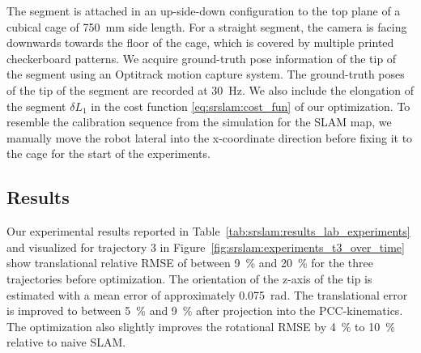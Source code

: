 %
The segment is attached in an up-side-down configuration to the top plane of a cubical cage of \SI{750}{mm} side length. For a straight segment, the camera is facing downwards towards the floor of the cage, which is covered by multiple printed checkerboard patterns.
%
We acquire ground-truth pose information of the tip of the segment using an Optitrack motion capture system. %
The ground-truth poses of the tip of the segment are recorded at \SI{30}{Hz}. %
%
%
We also include the elongation of the segment $\delta L_1$ in the cost function \eqref{eq:srslam:cost_fun} of our optimization.
%
To resemble the calibration sequence from the simulation for the \gls{SLAM} map, we manually move the robot lateral into the x-coordinate direction before fixing it to the cage for the start of the experiments.

\subsection{Results}
Our experimental results reported in Table~\ref{tab:srslam:results_lab_experiments} and visualized for trajectory 3 in Figure~\ref{fig:srslam:experiments_t3_over_time} show translational relative \gls{RMSE} of between \SI{9}{\percent} and \SI{20}{\percent} for the three trajectories before optimization. 
The orientation of the z-axis of the tip is estimated with a mean error of approximately \SI{0.075}{\radian}.
The translational error is improved to between \SI{5}{\percent} and \SI{9}{\percent} after projection into the \gls{PCC}-kinematics. 
The optimization also slightly improves the rotational \gls{RMSE} by \SI{4}{\percent} to \SI{10}{\percent} relative to naive \gls{SLAM}.

